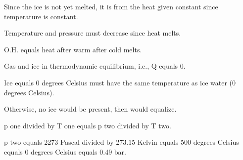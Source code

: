 Since the ice is not yet melted, it is from the heat given constant since temperature is constant.

Temperature and pressure must decrease since heat melts.

O.H. equals heat after warm after cold melts.

Gas and ice in thermodynamic equilibrium, i.e., Q equals 0.

Ice equals 0 degrees Celsius must have the same temperature as ice water (0 degrees Celsius).

Otherwise, no ice would be present, then would equalize.

p one divided by T one equals p two divided by T two.

p two equals 2273 Pascal divided by 273.15 Kelvin equals 500 degrees Celsius equals 0 degrees Celsius equals 0.49 bar.